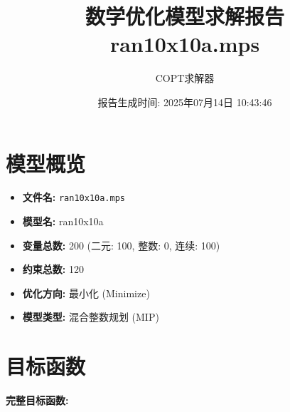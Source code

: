 \documentclass[a4paper,10pt]{article}
\title{数学优化模型求解报告\\{\large ran10x10a.mps}}
\author{COPT求解器}
\date{报告生成时间: 2025年07月14日 10:43:46}
\begin{document}
\maketitle
\tableofcontents
\newpage

\section{模型概览}
\begin{itemize}
    \item \textbf{文件名:} \texttt{ran10x10a.mps}
    \item \textbf{模型名:} ran10x10a
    \item \textbf{变量总数:} 200 (二元: 100, 整数: 0, 连续: 100)
    \item \textbf{约束总数:} 120
    \item \textbf{优化方向:} 最小化 (Minimize)
    \item \textbf{模型类型:} 混合整数规划 (MIP)
\end{itemize}
\section{目标函数}

\textbf{完整目标函数:}
\end{document}
